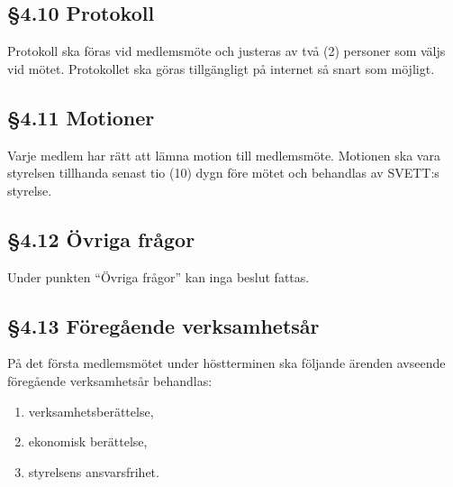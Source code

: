 \subsection*{\S4.10 Protokoll}

Protokoll ska föras vid medlemsmöte och justeras av två (2) personer som väljs vid
mötet. Protokollet ska göras tillgängligt på internet så snart som möjligt.

\subsection*{\S4.11 Motioner}

Varje medlem har rätt att lämna motion till medlemsmöte. Motionen ska vara
styrelsen tillhanda senast tio (10) dygn före mötet och behandlas av SVETT:s styrelse.

\subsection*{\S4.12 Övriga frågor}

Under punkten ``Övriga frågor'' kan inga beslut fattas.

\subsection*{\S4.13 Föregående verksamhetsår}

På det första medlemsmötet under höstterminen ska följande ärenden avseende
föregående verksamhetsår behandlas:
\begin{enumerate}[label=\roman*)]
	\item verksamhetsberättelse,
	\item ekonomisk berättelse,
	\item styrelsens ansvarsfrihet.
\end{enumerate}
